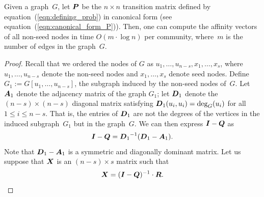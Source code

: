 \begin{theorem}\label{theorem:computing_NR}
Given a graph~$G$, let $\boldsymbol{P}$ be the $n \times n$ transition matrix 
defined by equation~(\ref{eqn:defining_prob}) in canonical form 
(see equation~(\ref{eqn:canonical_form_P})). Then, one can compute 
the affinity vectors of all non-seed nodes in time $O(m \cdot \log n)$ per community, 
where~$m$ is the number of edges in the graph~$G$.
\end{theorem}  
\begin{proof}
Recall that we ordered the nodes of $G$ as $u_1, \ldots, u_{n - s}, x_1, \ldots, x_s$, 
where $u_1, \ldots, u_{n - s}$ denote the non-seed nodes and $x_1, \ldots, x_s$ denote 
seed nodes. Define $G_1 := G[u_1, \ldots, u_{n - s}]$, the subgraph induced by the non-seed nodes 
of~$G$. Let $\boldsymbol{A}_1$ denote the adjacency matrix of the graph $G_1$; let 
$\boldsymbol{D}_1$ denote the $(n - s) \times (n - s)$ diagonal matrix satisfying 
$\boldsymbol{D}_1(u_i, u_i) = \deg_{G}(u_i)$ for all $1 \leq i \leq n - s$.  That is, the 
entries of $\boldsymbol{D}_1$ are not the degrees of the vertices in the induced subgraph~$G_1$ 
but in the graph~$G$. We can then express 
$\boldsymbol{I} - \boldsymbol{Q}$ as 
\begin{equation} \label{eqn:I-Q}
	\boldsymbol{I}  - \boldsymbol{Q} = {\boldsymbol{D}_1}^{-1} (\boldsymbol{D}_1 - \boldsymbol{A}_1).
\end{equation}
Note that $\boldsymbol{D}_1 - \boldsymbol{A}_1$ is a symmetric and diagonally dominant matrix. 
Let us suppose that $\boldsymbol{X}$ is an $(n - s) \times s$ matrix such that 
\[
	\boldsymbol{X} = (\boldsymbol{I} - \boldsymbol{Q})^{-1} \cdot \boldsymbol{R}.
\]


\end{proof}
